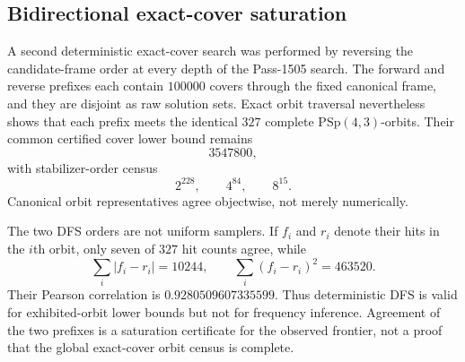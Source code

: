 \subsection*{Bidirectional exact-cover saturation}

A second deterministic exact-cover search was performed by reversing the
candidate-frame order at every depth of the Pass-1505 search.  The forward and
reverse prefixes each contain $100000$ covers through the fixed canonical frame,
and they are disjoint as raw solution sets.  Exact orbit traversal nevertheless
shows that each prefix meets the identical $327$ complete
$\mathrm{PSp}(4,3)$-orbits.  Their common certified cover lower bound remains
\[
3547800,
\]
with stabilizer-order census
\[
2^{228},\qquad 4^{84},\qquad 8^{15}.
\]
Canonical orbit representatives agree objectwise, not merely numerically.

The two DFS orders are not uniform samplers.  If $f_i$ and $r_i$ denote their
hits in the $i$th orbit, only seven of $327$ hit counts agree, while
\[
\sum_i|f_i-r_i|=10244,
\qquad
\sum_i(f_i-r_i)^2=463520.
\]
Their Pearson correlation is $0.9280509607335599$.  Thus deterministic DFS is
valid for exhibited-orbit lower bounds but not for frequency inference.
Agreement of the two prefixes is a saturation certificate for the observed
frontier, not a proof that the global exact-cover orbit census is complete.
